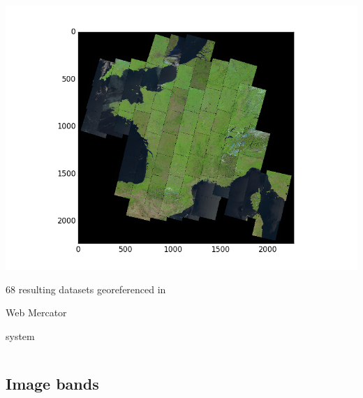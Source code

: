 \documentclass[c]{beamer}
\begin{document}
\begin{frame}
\begin{columns}[t]
\begin{column}{0.50\textwidth}
\begin{overlayarea}{\linewidth}{4cm}
  \centering\vfill
  \includegraphics[scale=0.25]{../../data/France/covering-selection.png}
\end{overlayarea}
\begin{overlayarea}{\linewidth}{1cm}
  \centering
  \scriptsize 68 resulting datasets georeferenced in \begin{itshape}Web Mercator\end{itshape} system\par
\end{overlayarea}
\end{column}
\end{columns}

\end{frame}

\subsection{Image bands}
\begin{frame}
\tableofcontents[currentsubsection]
\end{frame}
\end{document}
